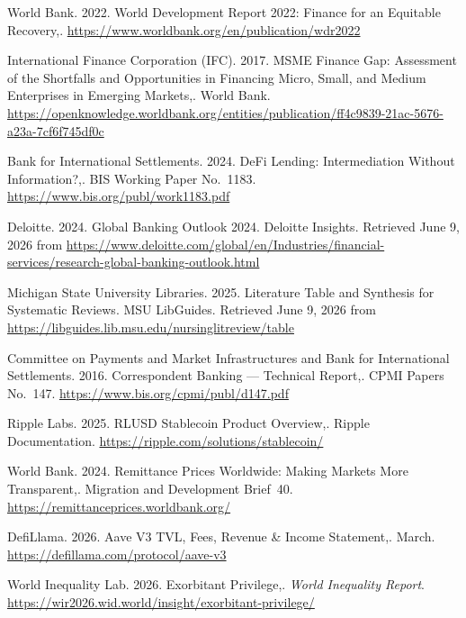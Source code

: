 {\begin{enumerate}[label={[\arabic*]}]
\item World Bank. 2022. World Development Report 2022: Finance for an Equitable Recovery,. \url{https://www.worldbank.org/en/publication/wdr2022}

\item International Finance Corporation (IFC). 2017. MSME Finance Gap: Assessment of the Shortfalls and Opportunities in Financing Micro, Small, and Medium Enterprises in Emerging Markets,. World Bank. \url{https://openknowledge.worldbank.org/entities/publication/ff4c9839-21ac-5676-a23a-7cf6f745df0c}

\item Bank for International Settlements. 2024. DeFi Lending: Intermediation Without Information?,. BIS Working Paper No.~1183. \url{https://www.bis.org/publ/work1183.pdf}

\item Deloitte. 2024. Global Banking Outlook 2024. Deloitte Insights. Retrieved June 9, 2026 from \url{https://www.deloitte.com/global/en/Industries/financial-services/research-global-banking-outlook.html}

\item Michigan State University Libraries. 2025. Literature Table and Synthesis for Systematic Reviews. MSU LibGuides. Retrieved June 9, 2026 from \url{https://libguides.lib.msu.edu/nursinglitreview/table}

\item Committee on Payments and Market Infrastructures and Bank for International Settlements. 2016. Correspondent Banking --- Technical Report,. CPMI Papers No.~147. \url{https://www.bis.org/cpmi/publ/d147.pdf}

\item Ripple Labs. 2025. RLUSD Stablecoin Product Overview,. Ripple Documentation. \url{https://ripple.com/solutions/stablecoin/}

\item World Bank. 2024. Remittance Prices Worldwide: Making Markets More Transparent,. Migration and Development Brief~40. \url{https://remittanceprices.worldbank.org/}

\item DefiLlama. 2026. Aave V3 TVL, Fees, Revenue \& Income Statement,. March. \url{https://defillama.com/protocol/aave-v3}

\item World Inequality Lab. 2026. Exorbitant Privilege,. \emph{World Inequality Report}. \url{https://wir2026.wid.world/insight/exorbitant-privilege/}


\end{enumerate}}
